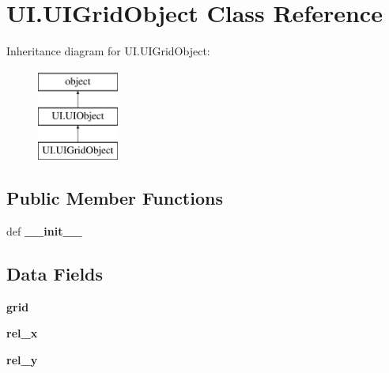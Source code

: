 \hypertarget{classUI_1_1UIGridObject}{\section{U\-I.\-U\-I\-Grid\-Object Class Reference}
\label{classUI_1_1UIGridObject}
}
Inheritance diagram for U\-I.\-U\-I\-Grid\-Object\-:\begin{figure}[H]
\begin{center}
\leavevmode
\includegraphics[height=3.000000cm]{classUI_1_1UIGridObject}
\end{center}
\end{figure}
\subsection*{Public Member Functions}
\begin{DoxyCompactItemize}
\item 
\hypertarget{classUI_1_1UIGridObject_acbf499a6157cb0cde43081bbff3074cd}{def {\bfseries \-\_\-\-\_\-init\-\_\-\-\_\-}}\label{classUI_1_1UIGridObject_acbf499a6157cb0cde43081bbff3074cd}

\end{DoxyCompactItemize}
\subsection*{Data Fields}
\begin{DoxyCompactItemize}
\item 
\hypertarget{classUI_1_1UIGridObject_a4029d3dcf3e99bb3421e00848f72028b}{{\bfseries grid}}\label{classUI_1_1UIGridObject_a4029d3dcf3e99bb3421e00848f72028b}

\item 
\hypertarget{classUI_1_1UIGridObject_a4fd5fc4e243ab419ea28b6321cb24f19}{{\bfseries rel\-\_\-x}}\label{classUI_1_1UIGridObject_a4fd5fc4e243ab419ea28b6321cb24f19}

\item 
\hypertarget{classUI_1_1UIGridObject_ad1e46510929ad0f70911329409494e51}{{\bfseries rel\-\_\-y}}\label{classUI_1_1UIGridObject_ad1e46510929ad0f70911329409494e51}

\end{DoxyCompactItemize}
